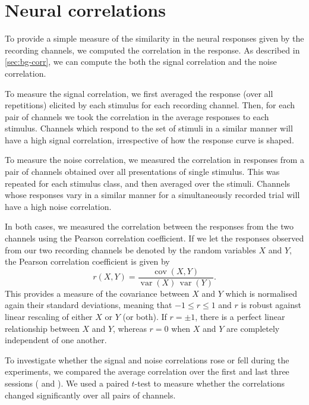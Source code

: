 \section{Neural correlations}

To provide a simple measure of the similarity in the neural responses given by the recording channels, we computed the correlation in the response.
As described in \autoref{sec:bg-corr}, we can compute the both the signal correlation and the noise correlation.

To measure the signal correlation, we first averaged the response (over all repetitions) elicited by each stimulus for each recording channel.
Then, for each pair of channels we took the correlation in the average responses to each stimulus.
Channels which respond to the set of stimuli in a similar manner will have a high signal correlation, irrespective of how the response curve is shaped.

To measure the noise correlation, we measured the correlation in responses from a pair of channels obtained over all presentations of single stimulus.
This was repeated for each stimulus class, and then averaged over the stimuli.
Channels whose responses vary in a similar manner for a simultaneously recorded trial will have a high noise correlation.

In both cases, we measured the correlation between the responses from the two channels using the Pearson correlation coefficient.
If we let the responses observed from our two recording channels be denoted by the random variables $X$ and $Y$, the Pearson correlation coefficient is given by
\begin{equation}
\label{eq:pearson}
r(X,Y) = \frac{\operatorname{cov}(X,Y)}{\operatorname{var}(X) \, \operatorname{var}(Y)}
.\end{equation}
This provides a measure of the covariance between $X$ and $Y$ which is normalised again their standard deviations, meaning that $-1 \le r \le 1$ and $r$ is robust against linear rescaling of either $X$ or $Y$ (or both).
If $r=\pm1$, there is a perfect linear relationship between $X$ and $Y$, whereas $r=0$ when $X$ and $Y$ are completely independent of one another.

To investigate whether the signal and noise correlations rose or fell during the experiments, we compared the average correlation over the first and last three sessions ( and ).
We used a paired $t$-test to measure whether the correlations changed significantly over all pairs of channels.


